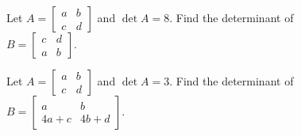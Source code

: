 \documentclass{ximera}
\begin{document}
      \begin{question} Let $A = \begin{bmatrix} a & b\\ c&d\end{bmatrix}$ and $\det A = 8$. Find the determinant of \\ $B = \begin{bmatrix} c & d\\ a&b\end{bmatrix}$.\\
      	
      	
      \end{question}	
            \begin{question} Let $A = \begin{bmatrix} a & b\\ c&d\end{bmatrix}$ and $\det A = 3$. Find the determinant of \\ $B = \begin{bmatrix} a & b\\ 4a+c&4b+d\end{bmatrix}$.\\
            	
            	
            \end{question}	
  
\end{document}

